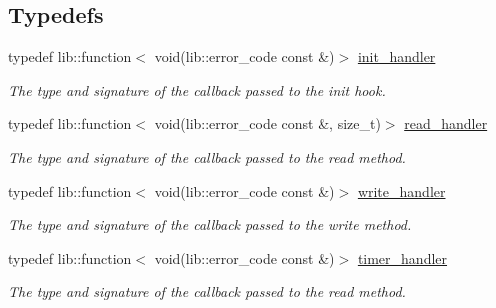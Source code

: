 \subsection*{Typedefs}
\begin{DoxyCompactItemize}
\item 
\mbox{\label{namespacewebsocketpp_1_1transport_aeae75e675c1a334b3b33ab7120b480a5}} 
typedef lib\+::function$<$ void(lib\+::error\+\_\+code const \&)$>$ \mbox{\hyperlink{namespacewebsocketpp_1_1transport_aeae75e675c1a334b3b33ab7120b480a5}{init\+\_\+handler}}
\begin{DoxyCompactList}\small\item\em The type and signature of the callback passed to the init hook. \end{DoxyCompactList}\item 
\mbox{\label{namespacewebsocketpp_1_1transport_a3a9b2ed54dfcc6ebe7d7e6b4c02f53fb}} 
typedef lib\+::function$<$ void(lib\+::error\+\_\+code const \&, size\+\_\+t)$>$ \mbox{\hyperlink{namespacewebsocketpp_1_1transport_a3a9b2ed54dfcc6ebe7d7e6b4c02f53fb}{read\+\_\+handler}}
\begin{DoxyCompactList}\small\item\em The type and signature of the callback passed to the read method. \end{DoxyCompactList}\item 
\mbox{\label{namespacewebsocketpp_1_1transport_addf5d728159e7aa2bce2a0df947b1560}} 
typedef lib\+::function$<$ void(lib\+::error\+\_\+code const \&)$>$ \mbox{\hyperlink{namespacewebsocketpp_1_1transport_addf5d728159e7aa2bce2a0df947b1560}{write\+\_\+handler}}
\begin{DoxyCompactList}\small\item\em The type and signature of the callback passed to the write method. \end{DoxyCompactList}\item 
\mbox{\label{namespacewebsocketpp_1_1transport_a946cc56ff41139f3002149c15fd87bc9}} 
typedef lib\+::function$<$ void(lib\+::error\+\_\+code const \&)$>$ \mbox{\hyperlink{namespacewebsocketpp_1_1transport_a946cc56ff41139f3002149c15fd87bc9}{timer\+\_\+handler}}
\begin{DoxyCompactList}\small\item\em The type and signature of the callback passed to the read method. \end{DoxyCompactList}\item 

\end{DoxyCompactItemize}
